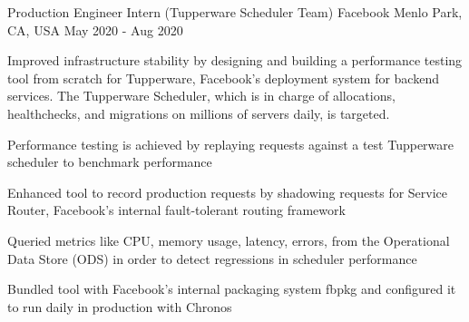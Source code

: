 

\begin{cventries}


  \cventry
  {Production Engineer Intern (Tupperware Scheduler Team)} %
    {Facebook} %
    {Menlo Park, CA, USA} %
    {May 2020 - Aug 2020} %
    {
      \begin{cvitems} 
	      \item {Improved infrastructure stability by designing and building a performance testing tool from scratch for Tupperware, Facebook's deployment system for backend services. The Tupperware Scheduler, which is in charge of allocations, healthchecks, and migrations on millions of servers daily, is targeted.}
	      \item {Performance testing is achieved by replaying requests against a test Tupperware scheduler to benchmark performance}
	      \item {Enhanced tool to record production requests by shadowing requests for Service Router, Facebook's internal fault-tolerant routing framework}
	      \item {Queried metrics like CPU, memory usage, latency, errors, from the Operational Data Store (ODS) in order to detect regressions in scheduler performance}
	      \item {Bundled tool with Facebook's internal packaging system fbpkg and configured it to run daily in production with Chronos}
      \end{cvitems}
    }


\end{cventries}
